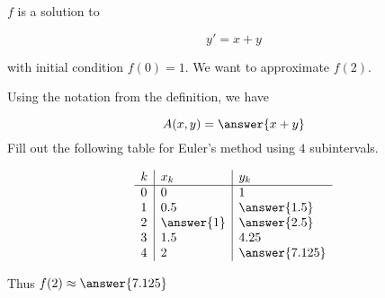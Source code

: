 \documentclass{ximera}
\begin{document}
	
\begin{question}
$f$ is a solution to 

\[
y'=x+y
\]

with initial condition $f(0)=1$.  We want to approximate $f(2)$.  

Using the notation from the definition, we have 

\[
A(x,y) = \answer{x+y}
\]
Fill out the following table for Euler's method using $4$ subintervals.

	\[
\begin{array}{l|l|l}
k & x_k & y_k \\ \hline
0 & 0   & 1 \\
1 & 0.5 & \answer{1.5} \\
2 & \answer{1} & \answer{2.5}  \\
3 & 1.5 & 4.25 \\
4 & 2 & \answer{7.125} \\
\end{array}
\]

	Thus $f(2) \approx \answer{7.125}$

\end{question}	
\end{document}
